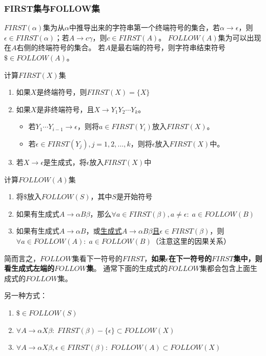 \subsubsection{FIRST集与FOLLOW集}
\begin{definition}[FIRST集与FOLLOW集]
$FIRST(\alpha)$集为从$\alpha$中推导出来的字符串第一个终端符号的集合，若$\alpha\to\epsilon$，则$\epsilon\in FIRST(\alpha)$；若$A\to c\gamma$，则$c\in FIRST(A)$。
$FOLLOW(A)$集为可以出现在$A$右侧的终端符号的集合。
若$A$是最右端的符号，则字符串结束符号$\$\in FOLLOW(A)$。
\end{definition}

\begin{myalgorithm}
计算$FIRST(X)$集
\begin{enumerate}
	\item 如果$X$是终端符号，则$FIRST(X)=\{X\}$
	\item 如果$X$是非终端符号，且$X\to Y_1Y_2\cdots Y_k$。
\begin{itemize}
	\item 若$Y_1\cdots Y_{i-1}\to\epsilon$，则将$a\in FIRST(Y_i)$放入$FIRST(X)$。
	\item 若$\epsilon\in FIRST(Y_j),j=1,2,\ldots,k$，则将$\epsilon$放入$FIRST(X)$中。
\end{itemize}
	\item 若$X\to\epsilon$是生成式，将$\epsilon$放入$FIRST(X)$中
\end{enumerate}
\end{myalgorithm}

\begin{myalgorithm}
计算$FOLLOW(A)$集
\begin{enumerate}
	\item 将$\$$放入$FOLLOW(S)$，其中$S$是开始符号
	\item 如果有生成式$A\to\alpha B\beta$，那么$\forall a\in FIRST(\beta),a \ne\epsilon:\;a\in FOLLOW(B)$
	\item 如果有生成式$A\to\alpha B$，或\underline{生成式$A\to\alpha B\beta$且$\epsilon\in FIRST(\beta)$}，则$\forall a\in FOLLOW(A):\;a\in FOLLOW(B)$（注意这里的因果关系）
\end{enumerate}
\end{myalgorithm}

简而言之，$FOLLOW$集看下一符号的$FIRST$，\textbf{如果$\epsilon$在下一符号的$FIRST$集中，则看生成式左端的$FOLLOW$集}。
通常下面的生成式的$FOLLOW$集都会包含上面生成式的$FOLLOW$集。

另一种方式：
\begin{enumerate}
	\item $\$ \in FOLLOW(S)$
	\item $\forall A\to\alpha X\beta:\;FIRST(\beta)-\{\epsilon\}\subset FOLLOW(X)$
	\item $\forall A\to\alpha X\beta,\epsilon\in FIRST(\beta):\;FOLLOW(A)\subset FOLLOW(X)$
\end{enumerate}


